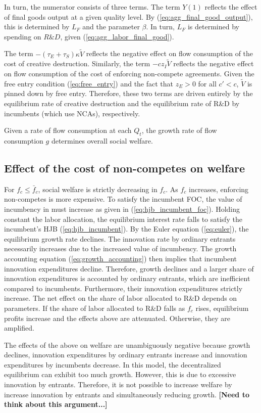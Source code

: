 \documentclass[12pt,english]{article}
\theoremstyle{remark}
\begin{document}
In turn, the numerator consists of three terms. The term $Y(1)$ reflects the effect of final goods output at a given quality level. By (\ref{eq:agg_final_good_output}), this is determined by $L_F$ and the parameter $\beta$. In turn, $L_F$ is determined by spending on $R\&D$, given (\ref{eq:agg_labor_final_good}).

The term $-(\tau_E + \tau_S) \kappa \tilde{V}$ reflects the negative effect on flow consumption of the cost of creative destruction. Similarly, the term $-cz_I \tilde{V}$ reflects the negative effect on flow consumption of the cost of enforcing non-compete agreements. Given the free entry condition (\ref{eq:free_entry}) and the fact that $z_E > 0$ for all $c' < c$, $\tilde{V}$ is pinned down by free entry. Therefore, these two terms are driven entirely by the equilibrium rate of creative destruction and the equilibrium rate of R\&D by incumbents (which use NCAs), respectively.

Given a rate of flow consumption at each $Q_t$, the growth rate of flow consumption $g$ determines overall social welfare. 

\subsection{Effect of the cost of non-competes on welfare}

For $f_c \le \bar{f}_c$, social welfare is strictly decreasing in $f_c$. As $f_c$ increases, enforcing non-competes is more expensive. To satisfy the incumbent FOC, the value of incumbency in must increase as given in (\ref{eq:hjb_incumbent_foc}). Holding constant the labor allocation, the equilibrium interest rate falls to satisfy the incumbent's HJB (\ref{eq:hjb_incumbent}). By the Euler equation (\ref{eq:euler}), the equilibrium growth rate declines. The innovation rate by ordinary entrants necessarily increases due to the increased value of incumbency. The growth accounting equation (\ref{eq:growth_accounting}) then implies that incumbent innovation expenditures decline. Therefore, growth declines and a larger share of innovation expenditures is accounted by ordinary entrants, which are inefficient compared to incumbents. Furthermore, their innovation expenditures strictly increase. The net effect on the share of labor allocated to R\&D depends on parameters. If the share of labor allocated to R\&D falls as $f_c$ rises, equilibrium profits increase and the effects above are attenuated. Otherwise, they are amplified. 

The effects of the above on welfare are unambiguously negative because growth declines, innovation expenditures by ordinary entrants increase and innovation expenditures by incumbents decrease. In this model, the decentralized equilibrium can exhibit too much growth. However, this is due to excessive innovation by entrants. Therefore, it is not possible to increase welfare by increase innovation by entrants and simultaneously reducing growth. \textbf{[Need to think about this argument...]}
\end{document}
